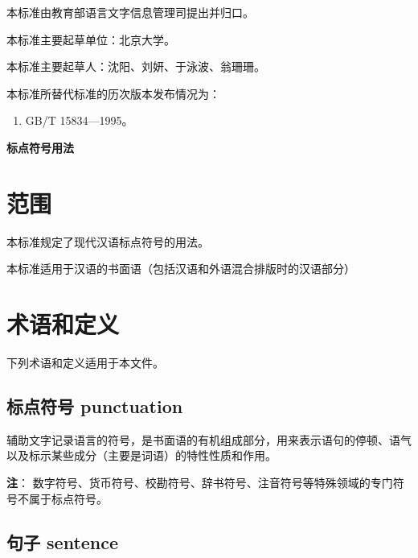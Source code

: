 \documentclass[a4paper]{article}
\begin{document}
{本标准由教育部语言文字信息管理司提出并归口。}

{本标准主要起草单位：北京大学。}

{本标准主要起草人：沈阳、刘妍、于泳波、翁珊珊。}

{本标准所替代标准的历次版本发布情况为：}

\begin{enumerate}[label=——,labelsep=0pt,left=0em, align=left,topsep=1pt,parsep=1pt]
    \item GB/T 15834—1995。
\end{enumerate}


\newpage


\begin{center}
    \Large{\textbf{标\hspace{0.5em}点\hspace{0.5em}符\hspace{0.5em}号\hspace{0.5em}用\hspace{0.5em}法}}
\end{center}
\vspace{0.5cm}

\section{范围}

本标准规定了现代汉语标点符号的用法。

本标准适用于汉语的书面语（包括汉语和外语混合排版时的汉语部分）

\section{术语和定义}

下列术语和定义适用于本文件。

\subsection{标点符号 punctuation}

辅助文字记录语言的符号，是书面语的有机组成部分，用来表示语句的停顿、语气以及标示某些成分（主要是词语）的特性性质和作用。

\textbf{注}：
数字符号、货币符号、校勘符号、辞书符号、注音符号等特殊领域的专门符号不属于标点符号。

\subsection{句子 sentence}
\end{document}
